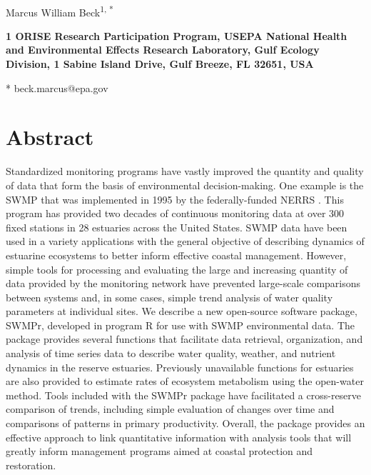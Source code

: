 \documentclass[10pt,letterpaper]{article}\usepackage[]{graphicx}\usepackage[]{color}
\date{}
\begin{document}
\vspace*{0.35in}

\begin{flushleft}
{\Large
\textbf{}
}
\newline
\\
Marcus William Beck\textsuperscript{1, *}

\bigskip
\bf{1} ORISE Research Participation Program, USEPA National Health and Environmental Effects Research Laboratory, Gulf Ecology Division, 1 Sabine Island Drive, Gulf Breeze, FL 32651, USA
\\
\bigskip

* beck.marcus@epa.gov

\end{flushleft}
\section*{Abstract}
Standardized monitoring programs have vastly improved the quantity and quality of data that form the basis of environmental decision-making.  One example is the \ac{SWMP} that was implemented in 1995 by the federally-funded \ac{NERRS} .  This program has provided two decades of continuous monitoring data at over 300 fixed stations in 28 estuaries across the United States.  \ac{SWMP} data have been used in a variety applications with the general objective of describing dynamics of estuarine ecosystems to better inform effective coastal management.  However, simple tools for processing and evaluating the large and increasing quantity of data provided by the monitoring network have prevented large-scale comparisons between systems and, in some cases, simple trend analysis of water quality parameters at individual sites.  We describe a new open-source software package, SWMPr, developed in program R for use with \ac{SWMP} environmental data.  The package provides several functions that facilitate data retrieval, organization, and analysis of time series data to describe water quality, weather, and nutrient dynamics in the reserve estuaries.  Previously unavailable functions for estuaries are also provided to estimate rates of ecosystem metabolism using the open-water method.  Tools included with the SWMPr package have facilitated a cross-reserve comparison of trends, including simple evaluation of changes over time and comparisons of patterns in primary productivity.  Overall, the package provides an effective approach to link quantitative information with analysis tools that will greatly inform management programs aimed at coastal protection and restoration.
\end{document}

